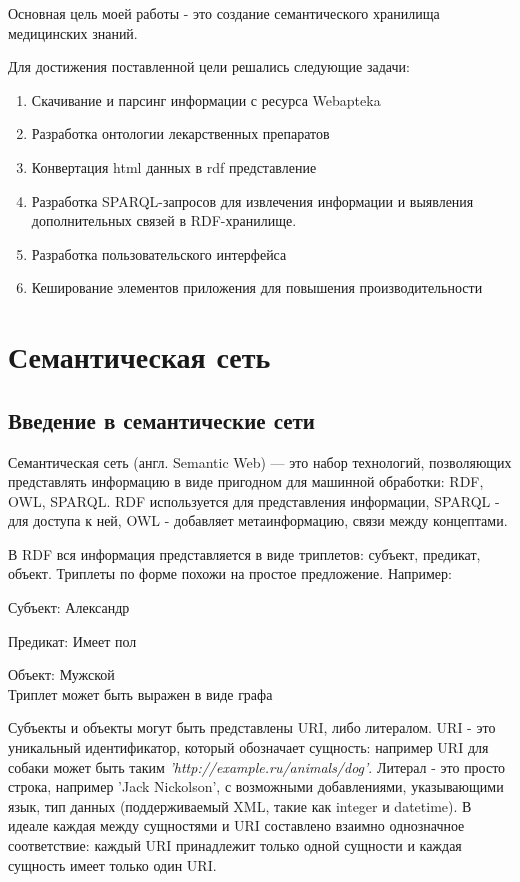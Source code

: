 \documentclass[specialist,subf,href,colorlinks=true
]{disser}
\begin{document}
Основная цель моей работы - это создание семантического хранилища медицинских знаний.

Для достижения поставленной цели решались следующие задачи:
\begin{enumerate}
\item Скачивание и парсинг информации с ресурса Webapteka
\item Разработка онтологии лекарственных препаратов
\item Конвертация html данных в rdf представление
\item Разработка SPARQL-запросов для извлечения информации и выявления дополнительных связей в RDF-хранилище.
\item Разработка пользовательского интерфейса
\item Кеширование элементов приложения для повышения производительности
\end{enumerate}

\chapter{Семантическая сеть}
\section{Введение в семантические сети}

Семантическая сеть (англ. Semantic Web) — это набор технологий, позволяющих представлять информацию в виде пригодном для машинной обработки: RDF, OWL, SPARQL. RDF используется для представления информации, SPARQL - для доступа к ней, OWL - добавляет метаинформацию, связи между концептами.

В RDF вся информация представляется в виде триплетов: субъект, предикат, объект. Триплеты по форме похожи на простое предложение.  Например:
\par Субъект: Александр
\par Предикат: Имеет пол
\par Объект: Мужской
\\Триплет может быть выражен в виде графа
\\
\par {}

Субъекты и объекты могут быть представлены URI, либо литералом. URI - это уникальный идентификатор, который обозначает сущность: например URI для собаки может быть таким \textit{'http://example.ru/animals/dog'}. Литерал - это просто строка, например 'Jack Nickolson', с возможными добавлениями, указывающими язык, тип данных (поддерживаемый XML, такие как integer и datetime). В идеале каждая между сущностями и URI составлено взаимно однозначное соответствие: каждый URI принадлежит только одной сущности и каждая сущность имеет только один URI.
\end{document}
